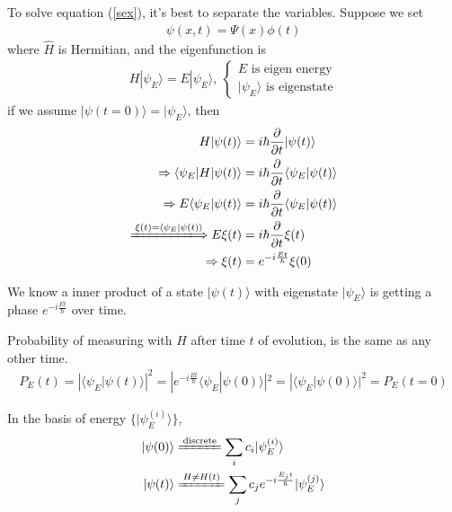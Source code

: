 \documentclass[UTF8,12pt]{article} %
\begin{document}
To solve equation (\ref{sex}), it's best to separate the variables. Suppose we set
\begin{align}
\psi(x,t) = \Psi(x)\phi(t)
\end{align}
where $\hat{H}$ is Hermitian, and the eigenfunction is
\begin{align}
H|\psi_{E}\rangle = E|\psi_{E}\rangle,~\begin{cases}E \text{ is eigen energy}\\|\psi_{E}\rangle \text{ is eigenstate}\end{cases}
\end{align}
if we assume $|\psi(t=0)\rangle = |\psi_{E}\rangle$, then
\begin{align}
H|\psi(t)\rangle &= i\hbar\frac{\partial}{\partial t}|\psi(t)\rangle \notag\\
\Rightarrow \langle\psi_{E}|H|\psi(t)\rangle &= i\hbar\frac{\partial}{\partial t}\langle\psi_{E}|\psi(t)\rangle \\
\Rightarrow E\langle\psi_{E}|\psi(t)\rangle &= i\hbar\frac{\partial}{\partial t}\langle\psi_{E}|\psi(t)\rangle \\
\xLongrightarrow{\xi(t) = \langle\psi_{E}|\psi(t)\rangle} E\xi(t) &= i\hbar\frac{\partial}{\partial t}\xi(t) \\
\Rightarrow \xi(t) &= e^{-i\frac{Et}{\hbar}}\xi(0)
\end{align}

\begin{theorem}{}{}
We know a inner product of a state $|\psi(t)\rangle$ with eigenstate $|\psi_{E}\rangle$ is getting a phase $e^{-i\frac{Et}{\hbar}}$ over time.
\end{theorem}

Probability of measuring with $H$ after time $t$ of evolution, is the same as any other time.
\begin{align*}
P_{E}(t) = \left|\langle\psi_{E}|\psi(t)\rangle\right|^{2} = |e^{-i\frac{Et}{\hbar}}\langle \psi_{E}|\psi(0)\rangle|^{2} = |\langle \psi_{E}|\psi(0)\rangle|^{2} = P_{E}(t=0)
\end{align*}

\begin{corollary}{}{}
In the basis of energy $\{|\psi_{E}^{\left(i\right)}\rangle\}$,
\begin{align}
|\psi(0)\rangle &\xlongequal{\text{discrete}} \sum_{i} c_{i}|\psi_{E}^{\left(i\right)}\rangle \\
|\psi(t)\rangle &\xlongequal{H \ne H(t)} \sum_{j} c_{j} e^{-i\frac{E_{j}t}{\hbar}}|\psi_{E}^{\left(j\right)}\rangle
\end{align}
\end{corollary}
\end{document}
